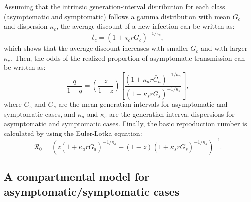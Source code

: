 \documentclass[12pt]{article}
\begin{document}
Assuming that the intrinsic generation-interval distribution for each class (asymptomatic and symptomatic) follows a gamma distribution with mean $\bar G_c$ and dispersion $\kappa_c$, the average discount of a new infection can be written as:
\begin{equation}
\delta_c = (1 + \kappa_c r \bar G_c)^{-1/\kappa_c},
\end{equation}
which shows that the average discount increases with smaller $\bar G_c$ and with larger $\kappa_c$.
Then, the odds of the realized proportion of asymptomatic transmission can be written as:
\begin{equation}
\frac{q}{1-q}=\left(\frac{z}{1-z}\right)\left[\frac{(1 + \kappa_a r \bar G_a)^{-1/\kappa_a}}{(1 + \kappa_s r \bar G_s)^{-1/\kappa_s}}\right],
\end{equation}
where $\bar G_a$ and $\bar G_s$ are the mean generation intervals for asymptomatic and symptomatic cases, and $\kappa_a$ and $\kappa_s$ are the generation-interval dispersions for asymptomatic and symptomatic cases.
Finally, the basic reproduction number is calculated by using the Euler-Lotka equation:
\begin{equation}
\mathcal R_0 = \left(z (1 + \kappa_a r \bar G_a)^{-1/\kappa_a} + (1-z) (1 + \kappa_s r \bar G_s)^{-1/\kappa_s}\right)^{-1}.
\end{equation}

\subsection*{A compartmental model for asymptomatic/symptomatic cases}
\end{document}
